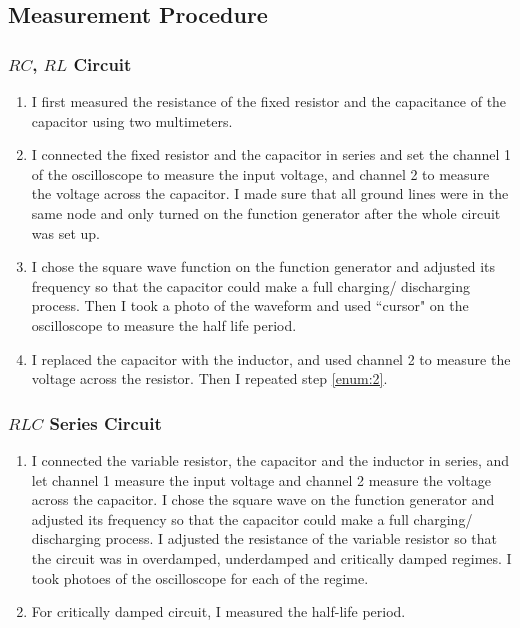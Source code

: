 \documentclass{my_template}
\begin{document}
    \subsection{Measurement Procedure}
    \subsubsection{$RC$, $RL$ Circuit}
    \begin{enumerate}
        \item  I first measured the resistance of the fixed resistor and the capacitance of the capacitor using two multimeters.
        \item I connected the fixed resistor and the capacitor in series and set the channel 1 of the oscilloscope to measure the input voltage, and channel 2 to measure the voltage across the capacitor. I made sure that all ground lines were in the same node and only turned on the function generator after the whole circuit was set up. 
        \item I chose the square wave function on the function generator and adjusted its frequency so that the capacitor could make a full charging/ discharging process. Then I took a photo of the waveform and used ``cursor" on the oscilloscope to measure the half life period.\label{enum:2}
        \item I replaced the capacitor with the inductor, and used channel 2 to measure the voltage across the resistor. Then I repeated step \ref{enum:2}.
    \end{enumerate}
    \subsubsection{$RLC$ Series Circuit}
    \begin{enumerate}
        \item I connected the variable resistor, the capacitor and the inductor in series, and let channel 1 measure the input voltage and channel 2 measure the voltage across the capacitor. I chose the square wave on the function generator and adjusted its frequency so that the capacitor could make a full charging/ discharging process. I adjusted the resistance of the variable resistor so that the circuit was in overdamped, underdamped and critically damped regimes. I took photoes of the oscilloscope for each of the regime.
        \item For critically damped circuit, I measured the half-life period. 
    \end{enumerate}
\end{document}
